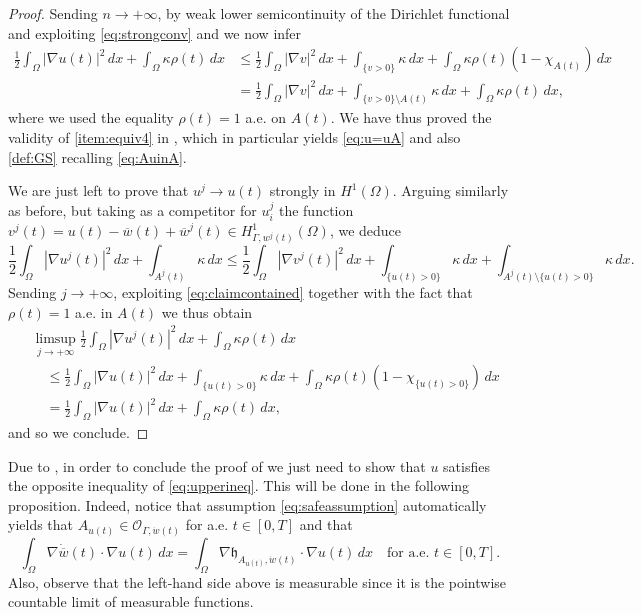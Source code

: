 \documentclass[a4paper,11pt,reqno]{amsart}
\numberwithin{equation}{section}
\theoremstyle{definition}
\theoremstyle{remark}
\begin{document}
\begin{proof}
Sending $n\to +\infty$, by weak lower semicontinuity of the Dirichlet functional and exploiting \eqref{eq:strongconv} and  we now infer
\begin{align}
    \frac 12 \int_\Omega |\nabla u(t)|^2 \, dx+\int_\Omega \kappa \rho(t)\, dx&\le \frac 12 \int_\Omega |\nabla v|^2 \, dx+\int_{\{v>0\}} \kappa \, dx+\int_\Omega \kappa \rho(t)(1-\chi_{A(t)})\, dx\\
    &=\frac 12 \int_\Omega |\nabla v|^2 \, dx+\int_{\{v>0\}\setminus A(t)} \kappa \, dx+\int_\Omega \kappa \rho(t)\, dx,
\end{align}
where we used the equality $\rho(t)=1$ a.e. on $A(t)$. We have thus proved the validity of \eqref{item:equiv4} in , which in particular yields \eqref{eq:u=uA} and also \ref{def:GS} recalling \eqref{eq:AuinA}.

We are just left to prove that $u^{j}\to u(t)$ strongly in $H^1(\Omega)$.
Arguing similarly as before, but taking as a competitor for $u_i^j$ the function $v^j(t)=u(t)-\overline w(t)+\overline w^{j}(t)\in H^1_{\Gamma,w^{j}(t)}(\Omega)$, we deduce
\begin{equation}
    \frac 12 \int_\Omega |\nabla u^{j}(t)|^2 \, dx+\int_{A^{j}(t)} \kappa \, dx\le \frac 12 \int_\Omega |\nabla v^{j}(t)|^2 \, dx+\int_{\{u(t)>0\}} \kappa \, dx+ \int_{ A^{j}(t)\setminus\{u(t)>0\}} \kappa \, dx.
\end{equation}
Sending $j\to +\infty$, exploiting \eqref{eq:claimcontained} together with the fact that $\rho(t)=1$ a.e. in $A(t)$ we thus obtain
\begin{align}
   &\limsup\limits_{j\to +\infty}\frac 12 \int_\Omega |\nabla u^{j}(t)|^2 \, dx+\int_\Omega \kappa\rho(t) \, dx\\
   &\quad \le \frac 12 \int_\Omega |\nabla u(t)|^2 \, dx+\int_{\{u(t)>0\}} \kappa \, dx+ \int_\Omega \kappa\rho(t) (1-\chi_{\{u(t)>0\}}) \, dx\\
   &\quad =\frac 12 \int_\Omega |\nabla u(t)|^2 \, dx+\int_\Omega \kappa\rho(t) \, dx,
\end{align}
and so we conclude.
\end{proof}

Due to , in order to conclude the proof of  we just need to show that $u$ satisfies the opposite inequality of \eqref{eq:upperineq}. This will be done in the following proposition. Indeed, notice that assumption \eqref{eq:safeassumption} automatically yields that $A_{u(t)}\in \mathcal O_{\Gamma,\dot w(t)}$ for a.e. $t\in [0,T]$   and that
    \begin{equation}
        \int_\Omega \nabla \dot{\overline w}(t)\cdot \nabla u(t) \, dx=\int_\Omega \nabla \mathfrak{h}_{A_{u(t)},\dot w(t)}\cdot \nabla u(t) \, dx \quad\text{for a.e. $t\in [0,T]$}.
    \end{equation}
Also, observe that the left-hand side above is measurable since it is the pointwise countable limit of measurable functions.
\end{document}
